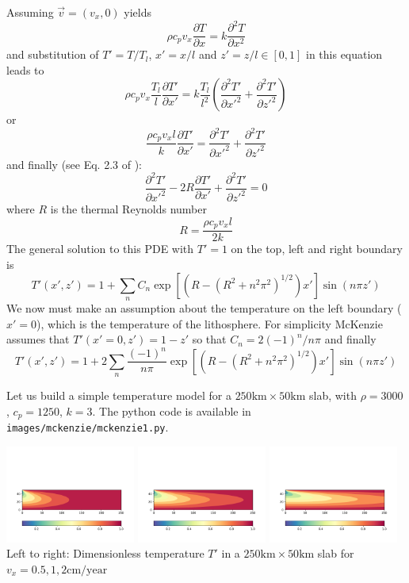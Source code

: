 Assuming $\vec v=(v_x,0)$ yields
\[
\rho c_p v_x \frac{\partial T}{\partial x} = k \frac{\partial^2 T}{\partial x^2}
\]
and substitution of $T'=T/T_l$, $x'=x/l$ and $z'=z/l\in[0,1]$ in this equation leads to
\[
\rho c_p v_x \frac{T_l}{l}\frac{\partial T'}{\partial x'} = k \frac{T_l}{l^2}
\left( \frac{\partial^2 T'}{\partial x'^2}
+ \frac{\partial^2 T'}{\partial z'^2} \right)
\]
or 
\[
\frac{\rho c_p v_x l }{k}\frac{\partial T'}{\partial x'} = 
\frac{\partial^2 T'}{\partial x'^2}
+ \frac{\partial^2 T'}{\partial z'^2} 
\]
and finally (see Eq. 2.3 of \cite{mcke69}): 
\[
\frac{\partial^2 T'}{\partial x'^2}
- 2 R \frac{\partial T'}{\partial x'} 
+ \frac{\partial^2 T'}{\partial z'^2} =0
\]
where $R$ is the thermal Reynolds number
\[
R=\frac{\rho c_p v_x l}{2 k}
\] 
The general solution to this PDE with $T'=1$ on the top, left and right boundary is 
\[
T'(x',z')= 1 + \sum_n C_n \exp \left[ \left( R-(R^2+n^2\pi^2)^{1/2} \right) x' \right] \sin (n \pi z')
\]
We now must make an assumption about the temperature on the left boundary ($x'=0$), 
which is the temperature of the lithosphere. 
For simplicity McKenzie assumes that $T'(x'=0,z')=1-z'$ so that $C_n=2(-1)^n/n\pi$ and finally
\begin{equation}
\boxed{
T'(x',z')= 1 + 2\sum_n \frac{(-1)^n}{n \pi} \exp \left[ \left( R-(R^2+n^2\pi^2)^{1/2} \right) x' \right] \sin (n \pi z')
}
\end{equation}

Let us build a simple temperature model for a $250\text{km}\times 50\text{km}$ slab, 
with $\rho=3000$, $c_p=1250$, $k=3$. The python code is available in {\tt images/mckenzie/mckenzie1.py}.

\begin{center}
\includegraphics[width=0.32\textwidth]{images/mckenzie/temperature_vel0p5.pdf}
\includegraphics[width=0.32\textwidth]{images/mckenzie/temperature_vel1.pdf}
\includegraphics[width=0.32\textwidth]{images/mckenzie/temperature_vel2.pdf}\\
{\small Left to right: Dimensionless temperature $T'$ in a $250\text{km}\times 50\text{km}$ slab 
for $v_x={0.5,1,2}\text{cm/year}$}
\end{center}

